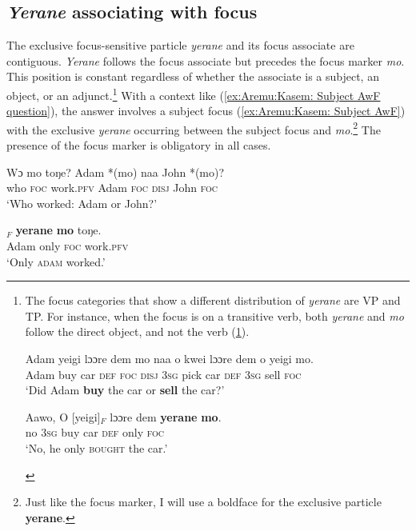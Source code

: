 \documentclass[output=paper,colorlinks,citecolor=brown,draftmode
]{langscibook}
\begin{document}
\subsection{\textit{Yerane} associating with focus}
\largerpage[-3]
The exclusive focus-sensitive particle \textit{yerane} and its focus associate are contiguous. \textit{Yerane} follows the focus associate but precedes the focus marker \textit{mo}. This position is constant regardless of whether the associate is a subject, an object, or an adjunct.\footnote{The focus categories that show a different distribution of \textit{yerane} are VP and TP. For instance, when the focus is on a transitive verb, both \textit{yerane} and \textit{mo} follow the direct object, and not the verb (\ref{ex:Aremu:Kasem: AwF verb focus}).

\ea
\begin{xlist}
    
\ex 
\gll Adam yeigi lɔɔre dem mo naa o kwei lɔɔre dem o yeigi mo.\\
	Adam buy car \textsc{def} \textsc{foc} \textsc{disj} 3\textsc{sg} pick car \textsc{def} 3\textsc{sg} sell \textsc{foc}\\
\glt `Did Adam \textbf{buy} the car or \textbf{sell} the car?'

\ex \label{ex:Aremu:Kasem: AwF verb focus}
\gll Aawo, O [yeigi]$_F$ lɔɔre dem \textbf{yerane} \textbf{mo}.\\
	no 3\textsc{sg} buy car \textsc{def} only \textsc{foc}\\
\glt `No, he only \textsc{bought} the car.'

\end{xlist}
\z

}
With a context like (\ref{ex:Aremu:Kasem: Subject AwF question}), the answer involves a subject focus (\ref{ex:Aremu:Kasem: Subject AwF}) with the exclusive \textit{yerane} occurring between the subject focus and \textit{mo}.\footnote{Just like the focus marker, I will use a boldface for the exclusive particle \textbf{yerane}.} The presence of the focus marker is obligatory in all cases.

\ea 
\begin{xlist}

\ex \label{ex:Aremu:Kasem: Subject AwF question}
\gll Wɔ mo toŋe? Adam *(mo) naa John *(mo)?\\
	 who \textsc{foc} work.\textsc{pfv} Adam \textsc{foc} \textsc{disj} John \textsc{foc}\\
\glt `Who worked: Adam or John?'

\ex \label{ex:Aremu:Kasem: Subject AwF}
\gll [Adam]$_F$ \textbf{yerane} \textbf{mo} toŋe.\\
	 Adam only \textsc{foc} work.\textsc{pfv}\\
\glt `Only \textsc{adam} worked.'

\end{xlist}
\z
\end{document}
